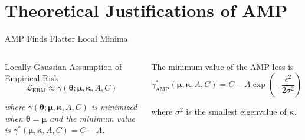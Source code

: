 \section{Theoretical Justifications of AMP}

\begin{frame}{AMP Finds Flatter Local Minima}

\begin{columns}

\begin{block}{Locally Gaussian Assumption of Empirical Risk}
\vspace{-0.5em}
\begin{equation*}
\mathcal{L}_\mathrm{ERM}\approx\gamma(\boldsymbol{\theta};\boldsymbol{\mu},\boldsymbol{\kappa},A,C)
\end{equation*}
\vspace{-1.5em}

\textit{where $\gamma(\boldsymbol{\theta};\boldsymbol{\mu},\boldsymbol{\kappa},A,C)$ is minimized when $\boldsymbol{\theta}=\boldsymbol{\mu}$ and the minimum value is $\gamma^\ast(\boldsymbol{\mu},\boldsymbol{\kappa},A,C)=C-A$.}
\end{block}

\begin{theorem}
The minimum value of the AMP loss is
\vspace{-0.5em}
\begin{equation*}
\gamma_\mathrm{AMP}^\ast(\boldsymbol{\mu},\boldsymbol{\kappa},A,C)=C-A\exp\left(-\frac{\epsilon^2}{2\sigma^2}\right)
\end{equation*}
\vspace{-1.5em}

where $\sigma^2$ is the smallest eigenvalue of $\boldsymbol{\kappa}$.
\end{theorem}


\end{columns}
\end{frame}
